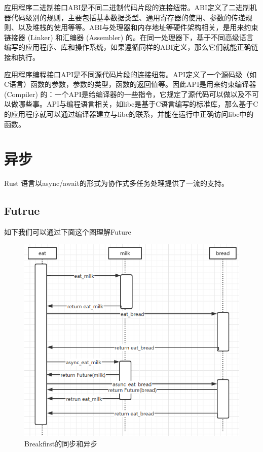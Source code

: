 应用程序二进制接口ABI是不同二进制代码片段的连接纽带。ABI定义了二进制机器代码级别的规则，主要包括基本数据类型、通用寄存器的使用、参数的传递规则、以及堆栈的使用等等。ABI与处理器和内存地址等硬件架构相关，是用来约束链接器 (Linker) 和汇编器 (Assembler) 的。在同一处理器下，基于不同高级语言编写的应用程序、库和操作系统，如果遵循同样的ABI定义，那么它们就能正确链接和执行。

应用程序编程接口API是不同源代码片段的连接纽带。API定义了一个源码级（如C语言）函数的参数，参数的类型，函数的返回值等。因此API是用来约束编译器 (Compiler) 的：一个API是给编译器的一些指令，它规定了源代码可以做以及不可以做哪些事。API与编程语言相关，如libc是基于C语言编写的标准库，那么基于C的应用程序就可以通过编译器建立与libc的联系，并能在运行中正确访问libc中的函数。


\section{异步}

Rust 语言以async/await的形式为协作式多任务处理提供了一流的支持。

\subsection{Futrue}

如下我们可以通过下面这个图理解Future

\begin{figure}[htb]
    \figureCapSet
    \centering
    \includegraphics[width=.8\linewidth]{figure/c2/breakfirstsequence.png}
    \caption{Breakfirst的同步和异步}
    \label{figure:c2breakfirstsequence}
\end{figure}

